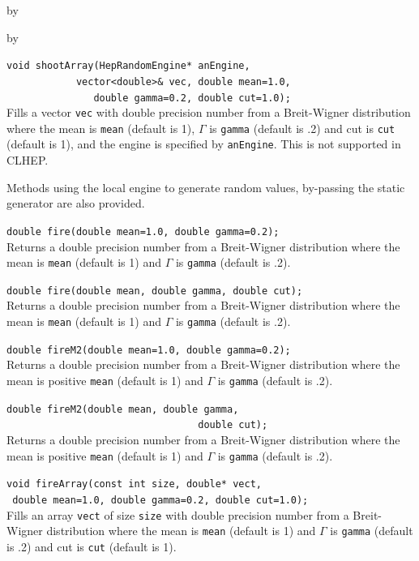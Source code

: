 \documentclass[twoside]{article}
\newcommand{\comp}[1]{\texttt{#1}}%
\newcommand{\entrylabel}[1]{\mbox{\textbf{{#1}}}\hfil}%
\newenvironment{entry}
{\begin{list}{}%
    {\renewcommand{\makelabel}{\entrylabel}%
     \setlength{\labelwidth}{90pt}%
     \setlength{\leftmargin}{\labelwidth}
     \advance\leftmargin by \labelsep%
      }%
    }%
  {\end{list}}
\newcommand{\Entrylabel}[1]%
{\raisebox{0pt}[1ex][0pt]{\makebox[\labelwidth][l]%
    {\parbox[t]{\labelwidth}{\hspace{0pt}\textbf{{#1}}}}}}
\newenvironment{Entry}%
{\renewcommand{\entrylabel}{\Entrylabel}\begin{entry}}%
  {\end{entry}}
\begin{document}
\begin{description}
\begin{Entry}
\begin{Entry}
    \verb+void shootArray(HepRandomEngine* anEngine,+\\
    \verb+            vector<double>& vec, double mean=1.0,+\\
    \verb+               double gamma=0.2, double cut=1.0);+\\
    Fills a vector \comp{vec} with double
    precision number from a Breit-Wigner
    distribution where the mean is \comp{mean} (default is 1),
    $\Gamma$ is \comp{gamma} (default is .2) and cut is
    \comp{cut} (default is 1), and the engine is specified
    by \comp{anEngine}.  This is not supported in CLHEP.
    
    Methods using the local engine to generate random values, by-passing
    the static generator are also provided.
    
    \verb+double fire(double mean=1.0, double gamma=0.2);+\\
    Returns a double precision number from a Breit-Wigner
    distribution where the mean is \comp{mean} (default is 1)
    and $\Gamma$ is \comp{gamma} (default is .2).
    
    \verb+double fire(double mean, double gamma, double cut);+\\
    Returns a double precision number from a Breit-Wigner
    distribution where the mean is \comp{mean} (default is 1)
    and $\Gamma$ is \comp{gamma} (default is .2).
    
    \verb+double fireM2(double mean=1.0, double gamma=0.2);+\\
    Returns a double precision number from a Breit-Wigner
    distribution where the mean is positive \comp{mean} (default is 1)
    and $\Gamma$ is \comp{gamma} (default is .2).
    
    \verb+double fireM2(double mean, double gamma,+\\
    \verb+                                 double cut);+\\
    Returns a double precision number from a Breit-Wigner
    distribution where the mean is positive \comp{mean} (default is 1)
    and $\Gamma$ is \comp{gamma} (default is .2).
    
    \verb+void fireArray(const int size, double* vect,+\\
    \verb+ double mean=1.0, double gamma=0.2, double cut=1.0);+\\
     Fills an array \comp{vect} of size \comp{size} with double
    precision number from a Breit-Wigner
    distribution where the mean is \comp{mean} (default is 1)
    and $\Gamma$ is \comp{gamma} (default is .2) and cut is
    \comp{cut} (default is 1).


\end{Entry}
\end{Entry}
\end{description}
\end{document}
